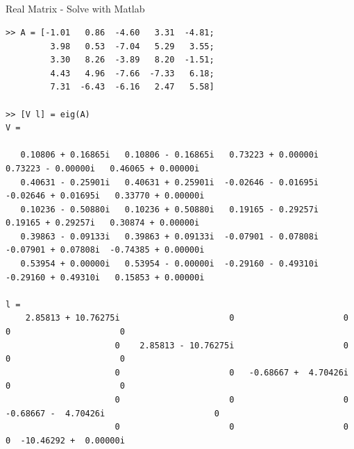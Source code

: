\documentclass[xcolor=x11names,compress]{beamer}
\renewcommand{\(}{\begin{columns}}
\renewcommand{\)}{\end{columns}}
\newcommand{\<}[1]{\begin{column}{#1}}
\renewcommand{\>}{\end{column}}
\begin{document}
\subsection{}
\begin{frame}[fragile]{Real Matrix - Solve with Matlab}
\begin{tiny}
\begin{verbatim}
>> A = [-1.01   0.86  -4.60   3.31  -4.81;
         3.98   0.53  -7.04   5.29   3.55;
         3.30   8.26  -3.89   8.20  -1.51;
         4.43   4.96  -7.66  -7.33   6.18;
         7.31  -6.43  -6.16   2.47   5.58]

>> [V l] = eig(A)
V =

   0.10806 + 0.16865i   0.10806 - 0.16865i   0.73223 + 0.00000i   0.73223 - 0.00000i   0.46065 + 0.00000i
   0.40631 - 0.25901i   0.40631 + 0.25901i  -0.02646 - 0.01695i  -0.02646 + 0.01695i   0.33770 + 0.00000i
   0.10236 - 0.50880i   0.10236 + 0.50880i   0.19165 - 0.29257i   0.19165 + 0.29257i   0.30874 + 0.00000i
   0.39863 - 0.09133i   0.39863 + 0.09133i  -0.07901 - 0.07808i  -0.07901 + 0.07808i  -0.74385 + 0.00000i
   0.53954 + 0.00000i   0.53954 - 0.00000i  -0.29160 - 0.49310i  -0.29160 + 0.49310i   0.15853 + 0.00000i

l =
    2.85813 + 10.76275i                      0                      0                      0                      0
                      0    2.85813 - 10.76275i                      0                      0                      0
                      0                      0   -0.68667 +  4.70426i                      0                      0
                      0                      0                      0   -0.68667 -  4.70426i                      0
                      0                      0                      0                      0  -10.46292 +  0.00000i
\end{verbatim}
\end{tiny} 
\end{frame}
\end{document}
